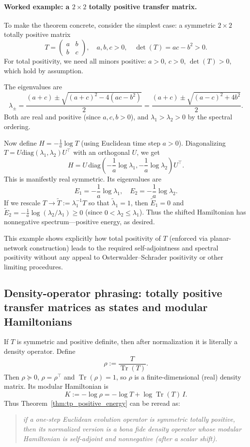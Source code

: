 \documentclass[11pt,oneside]{amsbook}
\numberwithin{equation}{section}
\theoremstyle{plain}
\theoremstyle{definition}
\theoremstyle{remark}
\DeclareMathOperator{\Tr}{\mathrm{Tr}}
\begin{document}
\paragraph{Worked example: a $2\times 2$ totally positive transfer matrix.}

To make the theorem concrete, consider the simplest case: a symmetric $2\times 2$ totally positive matrix
\[
T = \begin{pmatrix} a & b \\ b & c \end{pmatrix},
\quad a,b,c > 0, \quad \det(T)=ac-b^2>0.
\]
For total positivity, we need all minors positive: $a>0$, $c>0$, $\det(T)>0$, which hold by assumption.

The eigenvalues are
\[
\lambda_\pm = \frac{(a+c) \pm \sqrt{(a+c)^2-4(ac-b^2)}}{2} = \frac{(a+c) \pm \sqrt{(a-c)^2+4b^2}}{2}.
\]
Both are real and positive (since $a,c,b>0$), and $\lambda_1>\lambda_2>0$ by the spectral ordering.

Now define $H=-\frac{1}{a}\log T$ (using Euclidean time step $a>0$).
Diagonalizing $T=U\mathrm{diag}(\lambda_1,\lambda_2)U^\top$ with an orthogonal $U$, we get
\[
H = U\,\mathrm{diag}\left(-\frac{1}{a}\log\lambda_1, -\frac{1}{a}\log\lambda_2\right)U^\top.
\]
This is manifestly real symmetric. Its eigenvalues are
\[
E_1=-\frac{1}{a}\log\lambda_1, \quad E_2=-\frac{1}{a}\log\lambda_2.
\]
If we rescale $T \to \widetilde T:=\lambda_1^{-1}T$ so that $\widetilde\lambda_1=1$, then $\widetilde E_1=0$ and $\widetilde E_2=-\frac{1}{a}\log(\lambda_2/\lambda_1)\ge 0$ (since $0<\lambda_2\le\lambda_1$).
Thus the shifted Hamiltonian has nonnegative spectrum—positive energy, as desired.

This example shows explicitly how total positivity of $T$ (enforced via planar-network construction) leads to the required self-adjointness and spectral positivity without any appeal to Osterwalder--Schrader positivity or other limiting procedures.

\subsection{Density-operator phrasing: totally positive transfer matrices as states and modular Hamiltonians}

If $T$ is symmetric and positive definite, then after normalization it is literally a density operator.
Define
\[
\rho:=\frac{T}{\Tr(T)}.
\]
Then $\rho\succeq 0$, $\rho=\rho^\top$ and $\Tr(\rho)=1$, so $\rho$ is a finite-dimensional (real) density matrix.
Its modular Hamiltonian is
\[
K:=-\log\rho = -\log T + \log\Tr(T)\,I.
\]
Thus Theorem~\ref{thm:tp_positive_energy} can be reread as:
\begin{quote}
\emph{if a one-step Euclidean evolution operator is symmetric totally positive, then its normalized version is a bona fide density operator whose modular Hamiltonian is self-adjoint and nonnegative (after a scalar shift).}
\end{quote}
\end{document}
